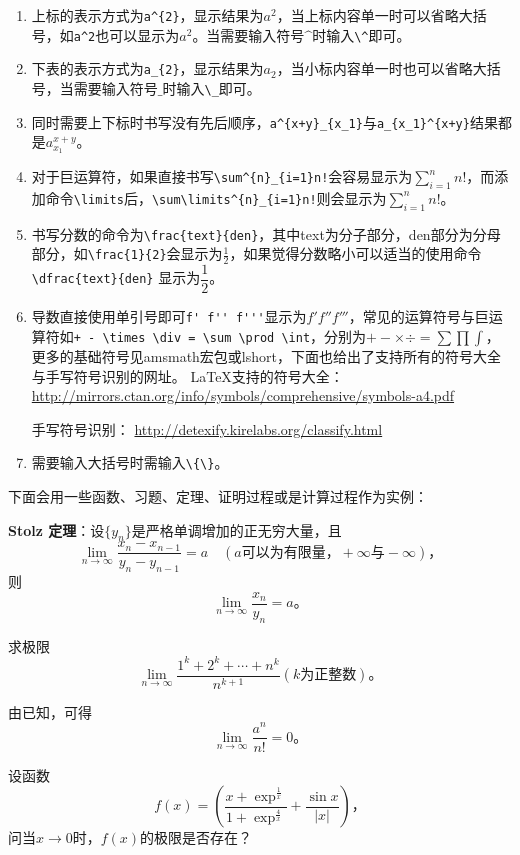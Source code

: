 \begin{enumerate}[1.]
\item 上标的表示方式为\verb|a^{2}|，显示结果为$a^{2}$，当上标内容单一时可以省略大括号，如\verb|a^2|也可以显示为$a^2$。当需要输入符号$\^$时输入\verb|\^|即可。
\item 下表的表示方式为\verb|a_{2}|，显示结果为$a_{2}$，当小标内容单一时也可以省略大括号，当需要输入符号$\_$时输入\verb|\_|即可。
\item 同时需要上下标时书写没有先后顺序，\verb|a^{x+y}_{x_1}|与\verb|a_{x_1}^{x+y}|结果都是$a_{x_1}^{x+y}$。
\item 对于巨运算符，如果直接书写\verb|\sum^{n}_{i=1}n!|会容易显示为$\sum^{n}_{i=1}n!$，而添加命令\verb|\limits|后，\verb|\sum\limits^{n}_{i=1}n!|则会显示为$\sum\limits^{n}_{i=1}n!$。
\item 书写分数的命令为\verb|\frac{text}{den}|，其中text为分子部分，den部分为分母部分，如\verb|\frac{1}{2}|会显示为$\frac{1}{2}$，如果觉得分数略小可以适当的使用命令\verb|\dfrac{text}{den}|
显示为$\dfrac{1}{2}$。
\item 导数直接使用单引号即可\verb|f' f'' f'''|显示为$f' f'' f'''$，常见的运算符号与巨运算符如\verb|+ - \times \div = \sum \prod \int|，分别为$+ - \times \div = \sum \prod \int$，更多的基础符号见amsmath宏包或lshort，下面也给出了支持所有的符号大全与手写符号识别的网址。
\LaTeX 支持的符号大全：
\url{http://mirrors.ctan.org/info/symbols/comprehensive/symbols-a4.pdf}

手写符号识别：
\url{http://detexify.kirelabs.org/classify.html}
\item 需要输入大括号时需输入\verb|\{\}|。
\end{enumerate}
下面会用一些函数、习题、定理、证明过程或是计算过程作为实例：

\textbf{Stolz 定理}：设$\{y_n\}$是严格单调增加的正无穷大量，且
\[
\lim\limits_{n \to \infty}\frac{x_n-x_{n-1}}{y_n-y_{n-1}}=a\quad (a\text{可以为有限量，}+\infty\text{与}-\infty)\text{，}
\]
则
\[
\lim\limits_{n \to \infty}\frac{x_n}{y_n}=a\text{。}
\]

求极限
\[
\lim\limits_{n \to \infty}\frac{1^k+2^k+\cdots+n^k}{n^{k+1}}(k\text{为正整数})\text{。}
\]

由已知，可得
\begin{equation}\label{equ1}
\lim\limits_{n \to \infty}\frac{a^n}{n!}=0\text{。}
\end{equation}

设函数
\[
f(x)=(\frac{x+\exp^{\frac{1}{x}}}{1+\exp^{\frac{4}{x}}}+\frac{\sin x}{|x|})\text{，}
\]
问当$x\to 0$时，$f(x)$的极限是否存在？


